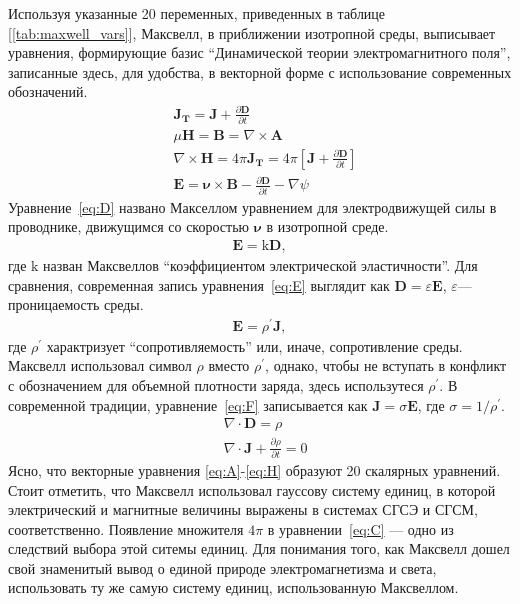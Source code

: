 \documentclass[12pt, oneside, a4paper]{article}
\begin{document}
Используя указанные 20 переменных, приведенных в таблице [\ref{tab:maxwell_vars}], Максвелл, в приближении изотропной среды, выписывает уравнения, формирующие базис ``Динамической теории электромагнитного поля'', записанные здесь, для удобства, в векторной форме с использование современных обозначений.
\begin{align}
&\mathbf{J_T}=\mathbf{J}+\frac{\partial{\mathbf{D}}}{\partial{t}}\label{eq:A}\\
&\mu\mathbf{H} = \mathbf{B} = \nabla\times\mathbf{A}\label{eq:B}\\
&\nabla\times\mathbf{H}=4\pi\mathbf{J_T}=4\pi\left[\mathbf{J}+\frac{\partial{\mathbf{D}}}{\partial{t}}\right]\label{eq:C}\\
&\mathbf{E}=\boldsymbol\nu\times\mathbf{B} - \frac{\partial{\mathbf{D}}}{\partial{t}} - \nabla\psi\label{eq:D}
\end{align}
Уравнение~\eqref{eq:D} названо Макселлом уравнением для электродвижущей силы в проводнике, движущимся со скоростью $\boldsymbol\nu$ в изотропной среде.
\begin{align}
\mathbf{E}=\mathrm{k}\mathbf{D},\label{eq:E}
\end{align}
где $\mathrm{k}$ назван Максвеллов ``коэффициентом электрической эластичности''. Для сравнения, современная запись уравнения~\eqref{eq:E} выглядит как $\mathbf{D}=\varepsilon\mathbf{E}$, $\varepsilon$---проницаемость среды.
\begin{align}
\mathbf{E}=\rho^{'}\mathbf{J},\label{eq:F}
\end{align}
где $\rho^{'}$ характризует ``сопротивляемость'' или, иначе, сопротивление среды. Максвелл использовал символ $\rho$ вместо $\rho^{'}$, однако, чтобы не вступать в конфликт с обозначением для объемной плотности заряда, здесь использутеся $\rho^{'}$. В современной традиции, уравнение~\eqref{eq:F} записывается как $\mathbf{J}=\sigma\mathbf{E}$, где $\sigma=1/\rho^{'}$.
\begin{align}
&\nabla\cdot\mathbf{D}=\rho\label{eq:G}\\
&\nabla\cdot\mathbf{J}+\frac{\partial{\rho}}{\partial{t}}=0\label{eq:H}
\end{align}
Ясно, что векторные уравнения \eqref{eq:A}-\eqref{eq:H} образуют 20 скалярных уравнений. Стоит отметить, что Максвелл использовал гауссову систему единиц, в которой электрический и магнитные величины выражены в системах СГСЭ и СГСМ, соответственно. Появление множителя $4\pi$ в уравнении~\eqref{eq:C} --- одно из следствий выбора этой ситемы единиц. Для понимания того, как Максвелл дошел свой знаменитый вывод о единой природе электромагнетизма и света, использовать ту же самую систему единиц, использованную Максвеллом.
\end{document}
